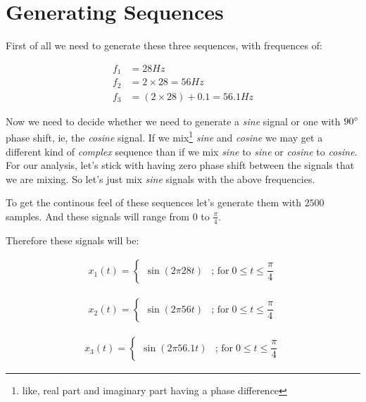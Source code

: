 \documentclass[../../course]{subfiles}
\begin{document}
\def\freqXOne{28}
\def\freqXTwo{56}
\def\freqXThree{56.1}

\section{Generating Sequences} \label{sec:wrkGenSeqs}

First of all we need to generate these three sequences, with frequences of:

\begin{align}
    f_{1} &= \freqXOne \si{Hz}                                  \label{eqn:freq1} \\
    f_{2} &= 2 \times \freqXOne         = \freqXTwo   \si{Hz}   \label{eqn:freq2} \\
    f_{3} &= (2 \times \freqXOne) + 0.1 = \freqXThree \si{Hz}   \label{eqn:freq3}
\end{align}

Now we need to decide whether we need to generate a \emph{sine} signal or one with
$90 \degree$ phase shift, ie, the \emph{cosine} signal. If we mix\footnote{like, real
part and imaginary part having a phase difference} \emph{sine} and \emph{cosine} we may
get a different kind of \emph{complex} sequence than if we mix \emph{sine} to \emph{sine}
or \emph{cosine} to \emph{cosine}. For our analysis, let's stick with having zero phase
shift between the signals that we are mixing. So let's just mix \emph{sine} signals with
the above frequencies.


To get the continous feel of these sequences let's generate them with $2500$ samples.
And these signals will range from $0$ to $\frac{\pi}{4}$.


Therefore these signals will be:

\begin{align}
    x_{1}(t) =
    \begin{cases}
        \sin(2 \pi \freqXOne t) & \text{; for} \; 0 \le t \le \dfrac{\pi}{4}
    \end{cases}
    \label{eqn:seqx1}
\end{align}

\begin{align}
    x_{2}(t) =
    \begin{cases}
        \sin(2 \pi \freqXTwo t) & \text{; for} \; 0 \le t \le \dfrac{\pi}{4}
    \end{cases}
    \label{eqn:seqx2}
\end{align}

\begin{align}
    x_{3}(t) =
    \begin{cases}
        \sin(2 \pi \freqXThree t) & \text{; for} \; 0 \le t \le \dfrac{\pi}{4}
    \end{cases}
    \label{eqn:seqx3}
\end{align}
\end{document}
